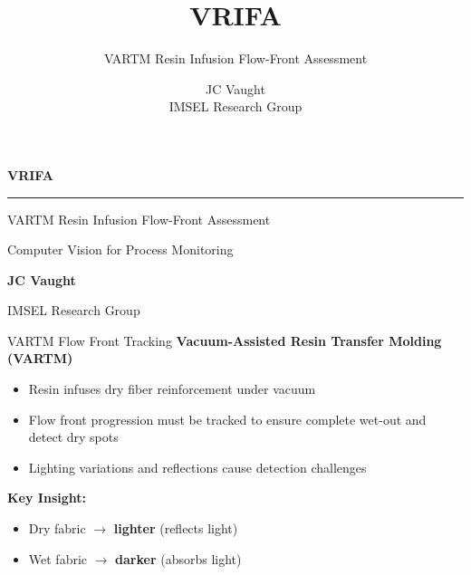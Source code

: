 \documentclass[aspectratio=169]{beamer}
\title{\textbf{VRIFA}}
\subtitle{VARTM Resin Infusion Flow-Front Assessment}
\author{JC Vaught\\[0.2cm]\small IMSEL Research Group}
\date{}
\begin{document}
\begin{frame}[plain]
\begin{center}
\vspace{1.5cm}

{\fontsize{48}{52}\selectfont\textcolor{garnet}{\textbf{VRIFA}}}

\vspace{0.4cm}

\textcolor{garnet}{\rule{8cm}{1.5pt}}

\vspace{0.4cm}

{\Large VARTM Resin Infusion Flow-Front Assessment}

\vspace{0.3cm}

{\normalsize Computer Vision for Process Monitoring}

\vspace{1.2cm}

{\large\textbf{JC Vaught}}

\vspace{0.2cm}

{\normalsize IMSEL Research Group}

\vfill
\end{center}
\end{frame}

\begin{frame}{VARTM Flow Front Tracking}
\textbf{Vacuum-Assisted Resin Transfer Molding (VARTM)}
\begin{itemize}
    \item Resin infuses dry fiber reinforcement under vacuum
    \item Flow front progression must be tracked to ensure complete wet-out and detect dry spots
    \item Lighting variations and reflections cause detection challenges
\end{itemize}

\vspace{0.8cm}
\textbf{Key Insight:}
\begin{itemize}
    \item Dry fabric $\rightarrow$ \textbf{lighter} (reflects light)
    \item Wet fabric $\rightarrow$ \textbf{darker} (absorbs light)
\end{itemize}
\end{frame}
\end{document}
